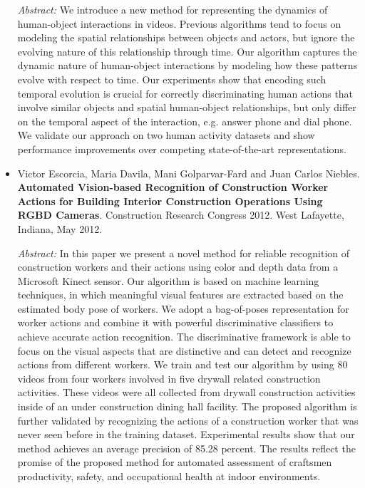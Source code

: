 \documentclass[margin]{res}
\begin{document}
\begin{resume}
\begin{itemize}
\textit{Abstract:} We introduce a new method for representing the dynamics of
human-object interactions in videos. Previous algorithms tend to focus on
modeling the spatial relationships between objects and actors, but ignore the
evolving nature of this relationship through time. Our algorithm captures the
dynamic nature of human-object interactions by modeling how these patterns
evolve with respect to time. Our experiments show that encoding such temporal
evolution is crucial for correctly discriminating human actions that involve
similar objects and spatial human-object relationships, but only differ on the
temporal aspect of the interaction, e.g. answer phone and dial phone.
We validate our approach on two human activity datasets and show performance
improvements over competing state-of-the-art representations.
\medskip

\item Victor Escorcia, Maria Davila, Mani Golparvar-Fard and Juan Carlos
Niebles. \textbf{Automated Vision-based Recognition of Construction Worker
Actions for Building Interior Construction Operations Using RGBD Cameras}.
Construction Research Congress 2012. West Lafayette, Indiana, May 2012.
\smallskip

\textit{Abstract:} In this paper we present a novel method for reliable
recognition of construction workers and their actions using color and depth
data from a Microsoft Kinect sensor. Our algorithm is based on machine learning
techniques, in which meaningful visual features are extracted based on the
estimated body pose of workers. We adopt a bag-of-poses representation for
worker actions and combine it with powerful discriminative classifiers to
achieve accurate action recognition. The discriminative framework is able to
focus on the visual aspects that are distinctive and can detect and recognize
actions from different workers. We train and test our algorithm by using 80
videos from four workers involved in five drywall related construction
activities. These videos were all collected from drywall construction
activities inside of an under construction dining hall facility. The proposed
algorithm is further validated by recognizing the actions of a construction
worker that was never seen before in the training dataset. Experimental
results show that our method achieves an average precision of 85.28 percent.
The results reflect the promise of the proposed method for automated assessment
of craftsmen productivity, safety, and occupational health at indoor
environments.

\end{itemize}
               


\end{resume}
\end{document}
